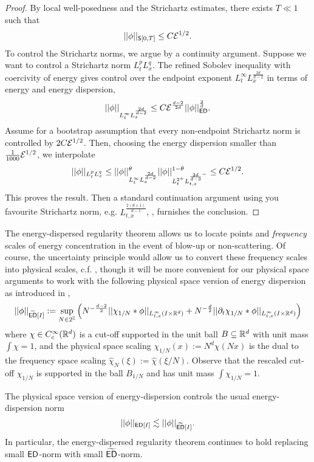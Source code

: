 \begin{proof}
	By local well-posedness and the Strichartz estimates, there exists $T \ll 1$ such that 
		\[
			||\phi||_{\mathsf S [0, T]} \leq C \mathcal E^{1/2}.
		\]
	To control the Strichartz norms, we argue by a continuity argument. Suppose we want to control a Strichartz norm $L^p_t L^q_x$. The refined Sobolev inequality with coercivity of energy gives control over the endpoint exponent $L^\infty_t L^{\frac{2d}{d - 2}}_x$ in terms of energy and energy dispersion, 
		\[
			||\phi||_{L^\infty_t L^{\frac{2d}{d - 2}}_x}
				\leq C \mathcal E^{\frac{d - 2}{2d}} || \phi||_{\mathsf{ED}}^{\frac2d}.
		\]			
	Assume for a bootstrap assumption that every non-endpoint Strichartz norm is controlled by $2C \mathcal E^{1/2}$. Then, choosing the energy dispersion smaller than $\tfrac1{1000} \mathcal E^{1/2}$, we interpolate
		\[
			||\phi||_{L^p_t L^q_x} \leq ||\phi||_{L^\infty_t L^{\frac{2d}{d - 2}}_x}^\theta ||\phi||_{L^{2^+}_t L^{\frac{2d}{d - 3}^-}_{t, x}}^{1- \theta} \leq C  \mathcal E^{1/2}.
		\]	
	This proves the result. Then a standard continuation argument using you favourite Strichartz norm, e.g. $L^{\frac{2(d + 1)}{d - 1}}_{t, x}$, \cite[Theorem 2.7]{KenigMerle2008}, furnishes the conclusion. 
\end{proof}

The energy-dispersed regularity theorem allows us to locate points and \textit{frequency} scales of energy concentration in the event of blow-up or non-scattering. Of course, the uncertainty principle would allow us to convert these frequency scales into physical scales, c.f. \cite[Section 6.2]{SterbenzTataru2010a}, though it will be more convenient for our physical space arguments to work with the following physical space version of energy dispersion as introduced in \cite[Section 8.1]{OhTataru2016},
	\[
		||\phi||_{\widetilde {\mathsf{ED}} [I]} 
			:= \sup_{N \in 2^\mathbb Z} \left( N^{-\frac{d - 2}{2}} ||\chi_{1/N} * \phi||_{L^\infty_{t, x} (I \times \mathbb R^d)} + N^{-\frac{d}{2}}  ||\partial_t \chi_{1/N} * \phi||_{L^\infty_{t, x} (I \times \mathbb R^d)} \right)
	\]	
where $\chi \in C^\infty_c (\mathbb R^d)$ is a cut-off supported in the unit ball $B \subseteq \mathbb R^d$ with unit mass $\int \chi = 1$, and the physical space scaling $\chi_{1/N} (x) := N^d  \chi(Nx)$ is the dual to the frequency space scaling $\widehat \chi_N (\xi) := \widehat \chi(\xi/N)$. Observe that the rescaled cut-off $\chi_{1/N}$ is supported in the ball $B_{1/N}$ and has unit mass $\int \chi_{1/N} = 1$. 

\begin{corollary}
	The physical space version of energy-dispersion controls the usual energy-dispersion norm 
		\[
			||\phi||_{\mathsf{ED}[I]} \lesssim ||\phi||_{\widetilde {\mathsf{ED}}[I]}.
		\]	
	In particular, the energy-dispersed regularity theorem continues to hold replacing small $\mathsf{ED}$-norm with small $\widetilde{\mathsf{ED}}$-norm.	
\end{corollary}

